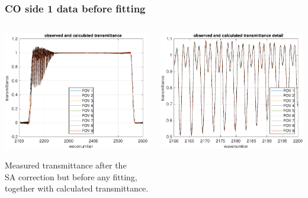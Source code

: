 \documentclass[9pt]{beamer}
\begin{document}
\begin{frame}
\frametitle{CO side 1 data before fitting}
\begin{columns}[t]
\begin{column}{0.5\textwidth}  
  \begin{centering}
  \includegraphics[width=\textwidth]{02-12_mn_s1_CO/spec_test2_all.pdf}
  \end{centering}\vspace{3mm}

Measured transmittance after the \\ SA correction but before any
fitting, together with calculated transmittance.

\end{column}

\begin{column}{0.5\textwidth}
  \begin{centering}
  \includegraphics[width=\textwidth]{02-12_mn_s1_CO/spec_test2_zoom.pdf}
  \end{centering}\vspace{3mm}


\end{column}
\end{columns}
\end{frame}
\end{document}
